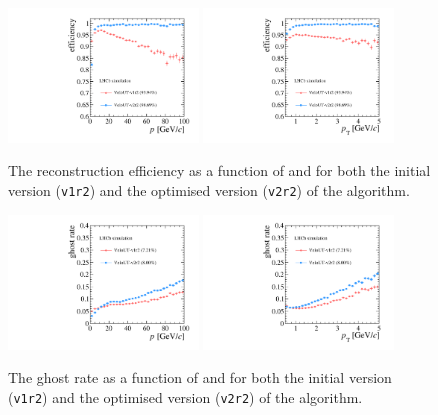 \begin{figure}[!htb]
\centering
\includegraphics[width=0.45\textwidth]{figs/upstream-tracking-upgrade/eff_p_comp.pdf}
\includegraphics[width=0.45\textwidth]{figs/upstream-tracking-upgrade/eff_pt_comp.pdf}
\caption{The reconstruction efficiency as a function of \ptot and \pt for both the initial version (\texttt{v1r2}) and the optimised version (\texttt{v2r2}) of the \velout algorithm.}
\label{fig:eff_velout_comp}
\end{figure}

\begin{figure}[!htb]
\centering
\includegraphics[width=0.45\textwidth]{figs/upstream-tracking-upgrade/gr_p_comp.pdf}
\includegraphics[width=0.45\textwidth]{figs/upstream-tracking-upgrade/gr_pt_comp.pdf}
\caption{The ghost rate as a function of \ptot and \pt for both the initial version (\texttt{v1r2}) and the optimised version (\texttt{v2r2}) of the \velout algorithm.}
\label{fig:gr_velout_comp}
\end{figure}

